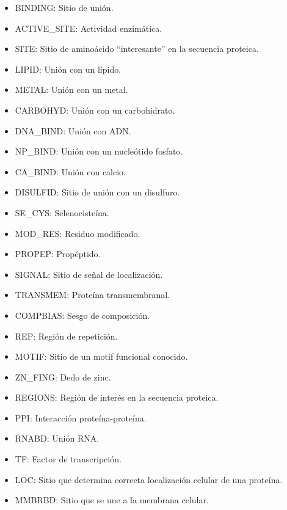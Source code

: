 \begin{itemize}
    \item BINDING: Sitio de unión.
    \item ACTIVE\_SITE: Actividad enzimática. 
    \item SITE: Sitio de aminoácido ``interesante'' en la secuencia proteica.
    \item LIPID: Unión con un lípido.
    \item METAL: Unión con un metal.
    \item CARBOHYD: Unión con un carbohidrato.
    \item DNA\_BIND: Unión con ADN.
    \item NP\_BIND: Unión con un nucleótido fosfato.
    \item CA\_BIND: Unión con calcio.
    \item DISULFID: Sitio de unión con un disulfuro.
    \item SE\_CYS: Selenocisteína.
    \item MOD\_RES: Residuo modificado.
    \item PROPEP: Propéptido.
    \item SIGNAL: Sitio de señal de localización.
    \item TRANSMEM: Proteína transmembranal.
    \item COMPBIAS: Sesgo de composición.
    \item REP: Región de repetición.
    \item MOTIF: Sitio de un motif funcional conocido.
    \item ZN\_FING: Dedo de zinc.
    \item REGIONS: Región de interés en la secuencia proteica.
    \item PPI: Interacción proteína-proteína.
    \item RNABD: Unión RNA.
    \item TF: Factor de transcripción. 
    \item LOC: Sitio que determina correcta localización celular de una proteína. 
    \item MMBRBD: Sitio que se une a la membrana celular.
\end{itemize}

